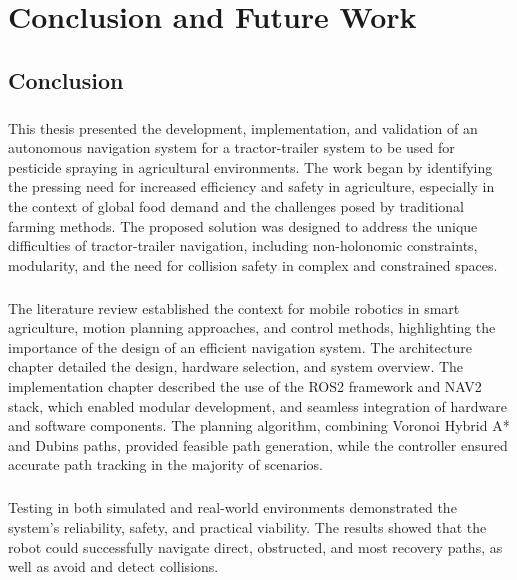 
\chapter{Conclusion and Future Work}
\label{cha:conclusion}

\section{Conclusion}
\paragraph{}This thesis presented the development, implementation, and validation of an autonomous navigation system for a tractor-trailer 
system to be used for pesticide spraying in agricultural environments. The work began by identifying the pressing need for 
increased efficiency and safety in agriculture, especially in the context of global food demand and the challenges 
posed by traditional farming methods. The proposed solution was designed to address the unique difficulties of 
tractor-trailer navigation, including non-holonomic constraints, modularity, and the need for collision 
safety in complex and constrained spaces.

\paragraph{}The literature review established the context for mobile robotics in smart agriculture, 
motion planning approaches, and control methods, highlighting the importance of the design of an efficient 
navigation system. The architecture chapter detailed the design, hardware selection, and system overview. The 
implementation chapter described the use of the \gls{ROS2} framework and \gls{NAV2} stack, which enabled modular 
development, and seamless integration of hardware and software components. The planning 
algorithm, combining Voronoi Hybrid A* and Dubins paths, provided feasible path generation, while the 
controller ensured accurate path tracking in the majority of scenarios.

\paragraph{}Testing in both simulated and real-world environments demonstrated the system's reliability, 
safety, and practical viability. The results showed that the robot could successfully navigate direct, obstructed, and 
most recovery paths, as well as avoid and detect collisions.

